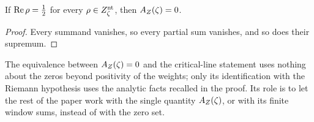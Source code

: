 \begin{theorem}
\label{thm:rh:translation-T-reverse}
If \(\operatorname{Re}\rho=\frac12\) for every \(\rho\in Z_{\zeta}^{\mathrm{nt}}\), then \(A_{Z}(\zeta)=0\).
\end{theorem}

\begin{proof}
Every summand vanishes, so every partial sum vanishes, and so does
their supremum.
\end{proof}

The equivalence between \(A_{Z}(\zeta)=0\) and the critical-line statement uses
nothing about the zeros beyond positivity of the weights; only its
identification with the Riemann hypothesis uses the analytic facts
recalled in the proof.  Its role is to let the rest of the paper work with the single
quantity \(A_{Z}(\zeta)\), or with its finite window sums, instead of with the
zero set.
